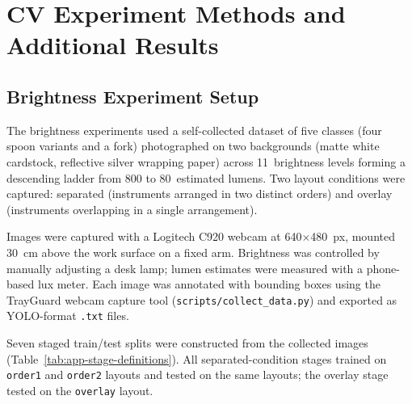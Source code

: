 \documentclass[10pt,a4paper]{article}
\begin{document}
\appendix




\section{CV Experiment Methods and Additional Results}
\label{sec:appendix-c-cv-experiment-methods}

\subsection{Brightness Experiment Setup}

The brightness experiments used a self-collected dataset of five classes
(four spoon variants and a fork) photographed on two backgrounds (matte
white cardstock, reflective silver wrapping paper) across 11~brightness
levels forming a descending ladder from 800 to 80~estimated lumens. Two
layout conditions were captured: separated (instruments arranged in two
distinct orders) and overlay (instruments overlapping in a single
arrangement).

Images were captured with a Logitech C920 webcam at 640$\times$480~px,
mounted 30~cm above the work surface on a fixed arm. Brightness was
controlled by manually adjusting a desk lamp; lumen estimates were
measured with a phone-based lux meter. Each image was annotated with
bounding boxes using the TrayGuard webcam capture tool
(\texttt{scripts/collect\_data.py}) and exported as YOLO-format
\texttt{.txt} files.

Seven staged train/test splits were constructed from the collected
images (Table~\ref{tab:app-stage-definitions}). All separated-condition
stages trained on \texttt{order1} and \texttt{order2} layouts and
tested on the same layouts; the overlay stage tested on the
\texttt{overlay} layout.
\end{document}
